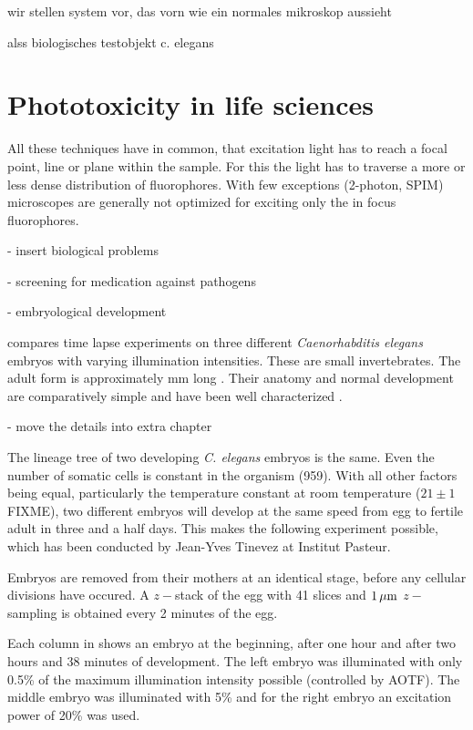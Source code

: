 wir stellen system vor, das vorn wie ein normales mikroskop aussieht


alss biologisches testobjekt c. elegans



\section{Phototoxicity in life sciences}

All these techniques have in common, that excitation light has to       
reach a focal point, line or plane within the sample. For this the
light has to traverse a more or less dense distribution of
fluorophores.  With few exceptions (2-photon, SPIM) microscopes are
generally not optimized for exciting only the in focus fluorophores.

- insert biological problems

- screening for medication against pathogens

- embryological development

 compares time lapse experiments on three    
different \emph{Caenorhabditis elegans} embryos with varying
illumination intensities. These are small invertebrates. The adult
form is approximately \unit[1]{mm} long . Their anatomy and normal
development are comparatively simple and have been well characterized
\citep{Durbin1987}.

- move the details into extra chapter

The lineage tree of two developing \emph{C. elegans} embryos is the     
same.  Even the number of somatic cells is constant in the organism
(959). With all other factors being equal, particularly the
temperature constant at room temperature ($21\pm 1$ FIXME), two different
embryos will develop at the same speed from egg to fertile adult in
three and a half days. This makes the following experiment possible,
which has been conducted by Jean-Yves Tinevez at Institut Pasteur.

Embryos are removed from their mothers at an identical stage, before    
any cellular divisions have occured. A $z-$stack of the egg with 41
slices and $\unit[1]{\mu m}$ $z-$sampling is obtained every 2 minutes
of the egg.

Each column in  shows an embryo at the     
beginning, after one hour and after two hours and 38 minutes of
development. The left embryo was illuminated with only 0.5\% of the
maximum illumination intensity possible (controlled by AOTF). The
middle embryo was illuminated with 5\% and for the right embryo an
excitation power of 20\% was used.

